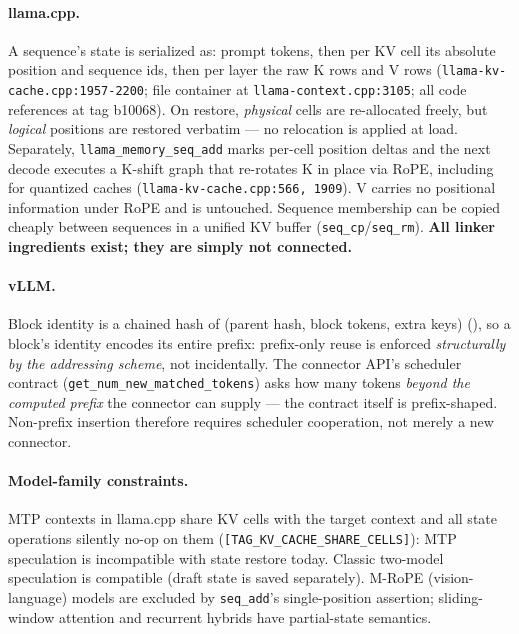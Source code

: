\documentclass[11pt]{article}
\newcommand{\code}[1]{\texttt{#1}}
\begin{document}
\paragraph{llama.cpp.}
A sequence's state is serialized as: prompt tokens, then per KV cell its absolute position and sequence ids, then per layer the raw K rows and V rows (\code{llama-kv-cache.cpp:1957-2200}; file container at \code{llama-context.cpp:3105}; all code references at tag b10068). On restore, \emph{physical} cells are re-allocated freely, but \emph{logical} positions are restored verbatim --- no relocation is applied at load. Separately, \code{llama\_memory\_seq\_add} marks per-cell position deltas and the next decode executes a K-shift graph that re-rotates K in place via RoPE, including for quantized caches (\code{llama-kv-cache.cpp:566, 1909}). V carries no positional information under RoPE and is untouched. Sequence membership can be copied cheaply between sequences in a unified KV buffer (\code{seq\_cp}/\code{seq\_rm}). \textbf{All linker ingredients exist; they are simply not connected.}

\paragraph{vLLM.}
{\sloppy
Block identity is a chained hash of (parent hash, block tokens, extra keys) (), so a block's identity encodes its entire prefix: prefix-only reuse is enforced \emph{structurally by the addressing scheme}, not incidentally. The connector API's scheduler contract (\code{get\_num\_new\_matched\_tokens}) asks how many tokens \emph{beyond the computed prefix} the connector can supply --- the contract itself is prefix-shaped. Non-prefix insertion therefore requires scheduler cooperation, not merely a new connector.\par}

\paragraph{Model-family constraints.}
MTP contexts in llama.cpp share KV cells with the target context and all state operations silently no-op on them (\code{[TAG\_KV\_CACHE\_SHARE\_CELLS]}): MTP speculation is incompatible with state restore today. Classic two-model speculation is compatible (draft state is saved separately). M-RoPE (vision-language) models are excluded by \code{seq\_add}'s single-position assertion; sliding-window attention and recurrent hybrids have partial-state semantics.
\end{document}

